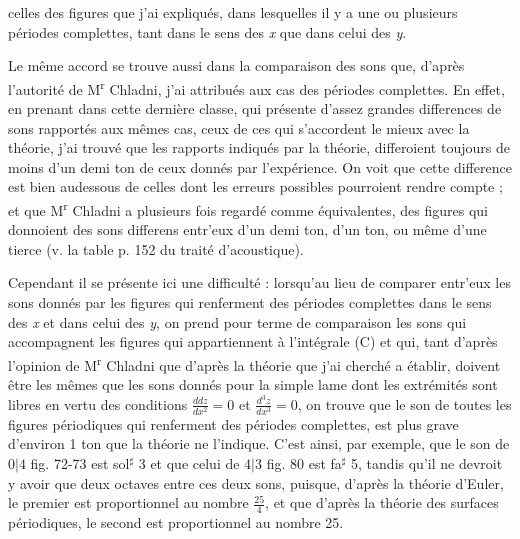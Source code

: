 \documentclass[11pt,a4paper]{article}
\begin{document}
celles des figures que j'ai expliqués, dans lesquelles il y a une ou plusieurs
périodes complettes, tant dans le sens des \emph{x} que dans celui des \emph{y}.

Le même accord se trouve aussi dans la comparaison des sons que, d'après
l'autorité de M\textsuperscript{r} Chladni, j'ai attribués aux cas des périodes complettes.
En effet, en prenant dans cette dernière classe, qui présente d'assez grandes
differences de sons rapportés aux mêmes cas, ceux de ces   qui s'accordent
le mieux avec la théorie, j'ai trouvé que les rapports indiqués par
la théorie, differoient toujours de moins d'un demi ton de ceux donnés
par l'expérience. On voit que cette difference est bien audessous de
celles dont les erreurs possibles pourroient rendre compte ; et que M\textsuperscript{r}
Chladni a plusieurs fois regardé comme équivalentes, des figures qui
donnoient des sons differens entr'eux d'un demi ton, d'un ton, ou même
d'une tierce (v. la table p. 152 du traité d'acoustique).

Cependant il se présente ici une difficulté : lorsqu'au lieu de comparer
entr'eux les sons donnés par les figures qui renferment des périodes
complettes dans le sens des \emph{x} et dans celui des \emph{y}, on prend pour terme
de comparaison les sons qui accompagnent les figures qui appartiennent
à l'intégrale (C) et qui, tant d'après l'opinion de M\textsuperscript{r} Chladni
que d'après la théorie que j'ai cherché a établir, doivent être les
mêmes que les sons donnés pour la simple lame dont les extrémités sont
libres en vertu des conditions $\frac{ddz}{dx^2}=0$ et $\frac{d^3z}{dx^3}=0$, on trouve que
le son de toutes les figures périodiques qui renferment des périodes
complettes, est plus grave d'environ 1 ton que la théorie ne l'indique.
C'est ainsi, par exemple, que le son de $0|4$ fig. 72-73 est sol$^{\sharp}$ 3
et que celui de $4|3$ fig. 80 est fa$^{\sharp}$ 5, tandis qu'il ne devroit y avoir que
deux octaves entre ces deux sons, puisque, d'après la théorie d'Euler,
le premier est proportionnel au nombre $\frac{25}{4}$, et que d'après la théorie
des surfaces périodiques, le second est proportionnel au nombre 25.

\end{document}
